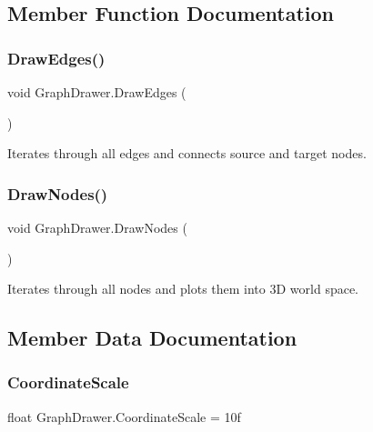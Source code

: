 \subsection{Member Function Documentation}
\mbox{\label{class_graph_drawer_ad4bde4b9d817629c77bc1e8818e5cd69}} 
\subsubsection{\texorpdfstring{DrawEdges()}{DrawEdges()}}
{\footnotesize\ttfamily void Graph\+Drawer.\+Draw\+Edges (\begin{DoxyParamCaption}{ }\end{DoxyParamCaption})\hspace{0.3cm}{\ttfamily [inline]}}



Iterates through all edges and connects source and target nodes. 

\mbox{\label{class_graph_drawer_a3aabb356d594c77af566191bc7869eff}} 
\subsubsection{\texorpdfstring{DrawNodes()}{DrawNodes()}}
{\footnotesize\ttfamily void Graph\+Drawer.\+Draw\+Nodes (\begin{DoxyParamCaption}{ }\end{DoxyParamCaption})\hspace{0.3cm}{\ttfamily [inline]}}



Iterates through all nodes and plots them into 3D world space. 



\subsection{Member Data Documentation}
\mbox{\label{class_graph_drawer_a0a09edfeab5c988ee4ed2e335b0897e7}} 
\subsubsection{\texorpdfstring{CoordinateScale}{CoordinateScale}}
{\footnotesize\ttfamily float Graph\+Drawer.\+Coordinate\+Scale = 10f}



